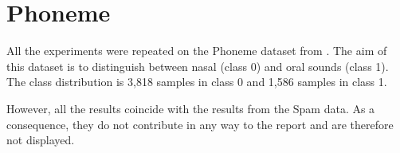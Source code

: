 \section{Phoneme}
\label{sec:Phoneme}
All the experiments were repeated on the Phoneme dataset from \cite{phoneme}. 
The aim of this dataset is to distinguish between nasal (class 0) and oral sounds (class 1). The class distribution is 3,818 samples in class 0 and 1,586 samples in class 1. 

However, all the results coincide with the results from the Spam data. As a consequence, they do not contribute in any way to the report and are therefore not displayed. 


\clearpage

